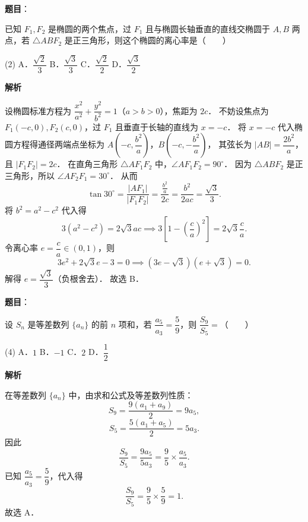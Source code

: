\begin{answer}

\textbf{题目}：

已知 $F_1, F_2$ 是椭圆的两个焦点，过 $F_1$ 且与椭圆长轴垂直的直线交椭圆于 $A, B$ 两点，若 $\triangle ABF_2$ 是正三角形，则这个椭圆的离心率是\mbox{（　　）}

\begin{gkopts}(2)
\task A．$\dfrac{\sqrt{2}}{3}$
\task B．$\dfrac{\sqrt{3}}{3}$
\task C．$\dfrac{\sqrt{2}}{2}$
\task D．$\dfrac{\sqrt{3}}{2}$
\end{gkopts}

\textbf{解析}

设椭圆标准方程为 $\dfrac{x^2}{a^2} + \dfrac{y^2}{b^2} = 1$（$a > b > 0$），焦距为 $2c$．
不妨设焦点为 $F_1(-c, 0), F_2(c, 0)$，过 $F_1$ 且垂直于长轴的直线为 $x = -c$．
将 $x = -c$ 代入椭圆方程得通径两端点坐标为 $A\left(-c, \dfrac{b^2}{a}\right)$，$B\left(-c, -\dfrac{b^2}{a}\right)$，
其弦长为 $|AB| = \dfrac{2b^2}{a}$，且 $|F_1 F_2| = 2c$．
在直角三角形 $\triangle A F_1 F_2$ 中，$\angle A F_1 F_2 = 90^\circ$．
因为 $\triangle ABF_2$ 是正三角形，所以 $\angle A F_2 F_1 = 30^\circ$．
从而
\nopagebreak[4]
\[
\tan 30^\circ = \frac{|A F_1|}{|F_1 F_2|} = \frac{\frac{b^2}{a}}{2c} = \frac{b^2}{2ac} = \frac{\sqrt{3}}{3}.
\]
将 $b^2 = a^2 - c^2$ 代入得
\nopagebreak[4]
\[
3(a^2 - c^2) = 2\sqrt{3}ac \implies 3\left[1 - \left(\frac{c}{a}\right)^2\right] = 2\sqrt{3}\frac{c}{a}.
\]
令离心率 $e = \dfrac{c}{a} \in (0, 1)$，则
\nopagebreak[4]
\[
3e^2 + 2\sqrt{3}e - 3 = 0 \implies (3e - \sqrt{3})(e + \sqrt{3}) = 0.
\]
解得 $e = \dfrac{\sqrt{3}}{3}$（负根舍去）．
故选 B．


\end{answer}
\begin{answer}

\textbf{题目}：

设 $S_n$ 是等差数列 $\{a_n\}$ 的前 $n$ 项和，若 $\dfrac{a_5}{a_3} = \dfrac{5}{9}$，则 $\dfrac{S_9}{S_5} = $\mbox{（　　）}

\begin{gkopts}(4)
\task A．$1$
\task B．$-1$
\task C．$2$
\task D．$\dfrac{1}{2}$
\end{gkopts}

\textbf{解析}

在等差数列 $\{a_n\}$ 中，由求和公式及等差数列性质：
\nopagebreak[4]
\[
S_9 = \frac{9(a_1 + a_9)}{2} = 9a_5,
\]
\nopagebreak[4]
\[
S_5 = \frac{5(a_1 + a_5)}{2} = 5a_3.
\]
因此
\nopagebreak[4]
\[
\frac{S_9}{S_5} = \frac{9a_5}{5a_3} = \frac{9}{5} \times \frac{a_5}{a_3}.
\]
已知 $\dfrac{a_5}{a_3} = \dfrac{5}{9}$，代入得
\nopagebreak[4]
\[
\frac{S_9}{S_5} = \frac{9}{5} \times \frac{5}{9} = 1.
\]
故选 A．


\end{answer}
